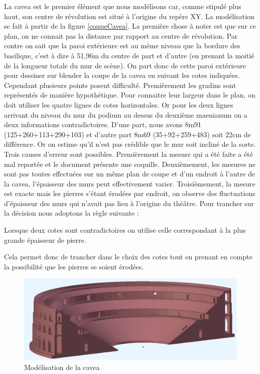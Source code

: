 La \gls{cavea} est le premier élément que nous modélisons car, comme stipulé plus haut, son centre de révolution est situé à l'origine du repère XY. La modélisation se fait à partir de la figure \ref{coupeCavea}. La première chose à noter est que sur ce plan, on ne connait pas la distance par rapport au centre de révolution. Par contre on sait que la paroi extérieure est au même niveau que la bordure des \gls{basilique}, c'est à dire à 51,96m du centre de part et d'autre (en prenant la moitié de la longueur totale du mur de scène). On part donc de cette paroi extérieure pour dessiner sur blender la coupe de la \gls{cavea} en suivant les cotes indiquées. Cependant plusieurs points posent difficulté. Premièrement les gradins sont représentés de manière hypothétique. Pour connaitre leur largeur dans le plan, on doit utiliser les quatre lignes de cotes horizontales. Or pour les deux lignes arrivant du niveau du mur du podium au dessus du deuxième \gls{maenianum} on a deux informations contradictoires. D'une part, nous avons 8m91 (125+260+113+290+103) et d'autre part 8m69 (35+92+259+483) soit 22cm de différence. Or on estime qu'il n'est pas crédible que le mur soit incliné de la sorte. Trois causes d'erreur sont possibles. Premièrement la mesure qui a été faite a été mal reportée et le document présente une coquille. Deuxièmement, les mesures ne sont pas toutes effectuées sur un même plan de coupe et d'un endroit à l'autre de la cavea, l'épaisseur des murs peut effectivement varier. Troisièmement, la mesure est exacte mais les pierres s'étant érodées par endroit, on observe des fluctuations d'épaisseur des murs qui n'avait pas lieu à l'origine du théâtre. Pour trancher sur la décision nous adoptons la règle suivante :

\begin{theo}\label{epaisseur}
	Lorsque deux cotes sont contradictoires on utilise celle correspondant à la plus grande épaisseur de pierre.
\end{theo}

Cela permet donc de trancher dans le choix des cotes tout en prenant en compte la possibilité que les pierres se soient érodées.

\begin{figure}[!h]
	\includegraphics[width=\linewidth]{images/modCavea}
	\caption{Modélisation de la \gls{cavea}} 
	\label{modCavea} 
\end{figure} 



